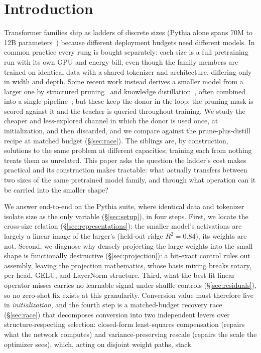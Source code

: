 \section{Introduction}
\label{sec:intro}

Transformer families ship as ladders of discrete sizes (Pythia alone spans
70M to 12B parameters~\citep{biderman2023pythia}) because different
deployment budgets need different models. In common practice every rung is
bought separately: each size is a full pretraining run with its own GPU and
energy bill, even though the family members are trained on identical data with a
shared tokenizer and architecture, differing only in width and depth. Some
recent work instead derives a smaller model from a larger one by structured
pruning~\citep{xia2024sheared,ma2023llmpruner} and knowledge
distillation~\citep{hinton2015distilling}, often combined into a single
pipeline~\citep{muralidharan2024minitron}; but these keep the donor in the loop:
the pruning mask is scored against it and the teacher is queried throughout
training. We study the cheaper and less-explored channel in which the donor is
used once, at initialization, and then discarded, and we compare against the
prune-plus-distill recipe at matched budget (\S\ref{sec:race}). The
siblings are, by construction, solutions to the same problem at different
capacities; training each from nothing treats them as unrelated. This paper asks
the question the ladder's cost makes practical and its construction makes
tractable: what actually transfers between two sizes of the same pretrained
model family, and through what operation can it be carried into the smaller
shape?

We answer end-to-end on the Pythia suite, where identical data and tokenizer
isolate size as the only variable (\S\ref{sec:setup}), in four steps. First, we
locate the cross-size relation (\S\ref{sec:representations}): the smaller model's
activations are largely a linear image of the larger's (held-out ridge
$R^2=0.84$), its weights are not. Second, we diagnose why densely projecting the
large weights into the small shape is functionally destructive
(\S\ref{sec:projection}): a bit-exact control rules out assembly, leaving the
projection mathematics, whose basis mixing breaks rotary, per-head, GELU, and
LayerNorm structure. Third, what the best-fit linear operator misses carries no
learnable signal under shuffle controls (\S\ref{sec:residuals}), so
no zero-shot fix exists at this granularity. Conversion value must therefore live in
\emph{initialization}, and the fourth step is a matched-budget recovery race
(\S\ref{sec:race}) that decomposes conversion into two independent levers over
structure-respecting selection: closed-form least-squares compensation
(repairs what the network computes) and variance-preserving rescale
(repairs the scale the optimizer sees), which, acting on disjoint weight paths,
stack.

